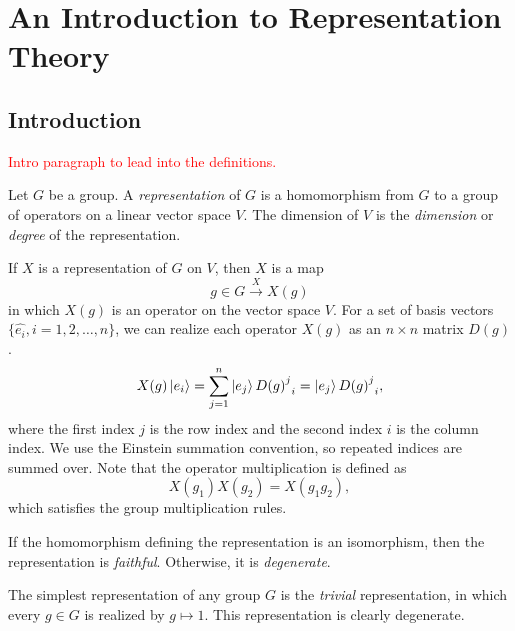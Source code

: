 \chapter{An Introduction to Representation Theory}\label{ch:rep_background}

\section{Introduction}

\textcolor{red}{Intro paragraph to lead into the definitions.}

\begin{definition}
    Let $G$ be a group. A \textit{representation} of $G$ is a homomorphism from $G$ to a group of operators on a linear vector space $V$. The dimension of $V$ is the \textit{dimension} or \textit{degree} of the representation.
\end{definition}

If $X$ is a representation of $G$ on $V$, then $X$ is a map
\begin{equation}
    g\in G\xrightarrow{X} X(g)
\end{equation}
in which $X(g)$ is an operator on the vector space $V$. For a set of basis vectors $\{\hat{e_i},i=1,2,\dots,n\}$, we can realize each operator $X(g)$ as an $n\times n$ matrix $D(g)$.
\begin{equation}
    X(g)\ket{e_i} = \sum_{j=1}^n \ket{e_j}{{D(g)}^j}_i = \ket{e_j}{{D(g)}^j}_i,
\end{equation}
where the first index $j$ is the row index and the second index $i$ is the column index. We use the Einstein summation convention, so repeated indices are summed over. Note that the operator multiplication is defined as
\begin{equation}
    X(g_1)X(g_2) = X(g_1g_2),
\end{equation}
which satisfies the group multiplication rules.

\begin{definition}
    If the homomorphism defining the representation is an isomorphism, then the representation is \textit{faithful}. Otherwise, it is \textit{degenerate}.
\end{definition}

\begin{example}
    The simplest representation of any group $G$ is the \textit{trivial} representation, in which every $g\in G$ is realized by $g\mapsto 1$. This representation is clearly degenerate.
\end{example}

